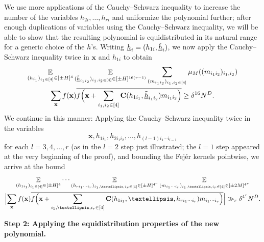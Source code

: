 \documentclass[11pt]{amsart}
\theoremstyle{definition}
\DeclareMathOperator*{\E}{\mathbb{E}}
\newcommand{\bc}{{\mathbf{C}}}
\newcommand{\bx}{{\mathbf{x}}}
\newcommand{\uh}{{\underline{h}}}
\newcommand{\Bigabs}[1]{\Bigl| #1 \Bigr|}
\newcommand{\Bigbrac}[1]{\Bigl( #1 \Bigr)}
\begin{document}
We use more applications of the Cauchy--Schwarz inequality to increase the number of the variables $h_{2i}, \ldots, h_{ri}$ and uniformize the polynomial further; after enough duplications of variables using the Cauchy--Schwarz inequality, we will be able to show that the resulting polynomial is equidistributed in its natural range for a generic choice of the $h$'s.
Writing $\uh_{i} = (h_{1i}, \Tilde{\uh}_{i})$, we now apply the Cauchy--Schwarz
inequality twice in $\bx$ and $h_{1i}$
to obtain
\begin{multline*}
    \E_{(h_{i_1})_{i_1\in [4]}\in[\pm H]^4}    \E_{(\tilde{\uh}_{i_1i_2})_{i_1,i_2\in [4]}\in[\pm H]^{16(r-1)}}
    \sum_{(m_{i_1i_2})_{i_1,i_2\in[4]}} \mu_M((m_{i_1i_2})_{i_1,i_2}) \\ \sum_\bx f(\bx)\overline{f\Bigbrac{\bx+\sum_{\substack{i_1,i_2\in[4]}}
    \bc(h_{1i_1}, \tilde{\uh}_{i_1i_2} )m_{i_1i_2}}}\geq \delta^{16} N^D.
\end{multline*}
We continue in this manner: Applying the Cauchy--Schwarz inequality twice in the variables $$\bx, h_{1i_1}, h_{2i_1 i_2}, \ldots, h_{(l-1)i_1\cdots i_{l-1}}$$ for each $l=3,4, \ldots, r$ (as in the $l=2$ step just illustrated; the $l=1$ step appeared at the very beginning of the proof), and bounding the Fej\'er kernels pointwise, we arrive at the bound
\begin{multline*}
    \E_{(h_{1i_1})_{i_1\in [4]}\in[\pm H]^4}
    \cdots \E_{(h_{ri_1\cdots i_r})_{i_1, \ldots,  i_r\in [4]}\in[\pm H]^{4^r}}\E_{(m_{i_1\cdots  i_r})_{i_1, \ldots, i_r\in[4]}\in[\pm 2M]^{4^r}}\\
    \Bigabs{\sum_\bx f(\bx)\overline{f\Bigbrac{\bx+\sum_{\substack{i_1,\ldots, i_r\in[4]}}\bc(h_{1i_1}, \ldots, h_{ri_1\cdots  i_r})m_{i_1\cdots  i_r}}}}\gg_r \delta^{4^r} N^D.
\end{multline*}

\smallskip
\textbf{Step 2: Applying the equidistribution properties of the new polynomial.}
\smallskip
\end{document}
